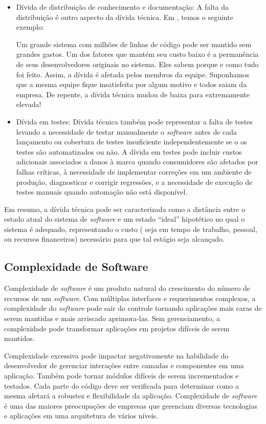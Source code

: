 \begin{itemize}
	\item Dívida de distribuição de conhecimento e documentação: A falta da distribuição é outro aspecto da dívida técnica. Em \cite{slinker2008}, temos o seguinte exemplo:
	\begin{quoteAbnt}
		Um grande sistema com milhões de linhas de código pode ser mantido sem grandes gastos. Um dos fatores que mantém seu custo baixo é a permanência de seus desenvolvedores originais no sistema. Eles sabem porque e como tudo foi feito. Assim, a dívida é afetada pelos membros da equipe. Suponhamos que a mesma equipe fique insatisfeita por algum motivo e todos saiam da empresa. De repente, a dívida técnica mudou de baixa para extremamente elevada!
	\end{quoteAbnt}
	\item Dívida em testes:	Dívida técnica também pode representar a falta de testes levando a necessidade de testar manualmente o \textit{software} antes de cada lançamento ou cobertura de testes insuficiente independentemente se o os testes são automatizados ou não. A dívida em testes  pode incluir custos adicionais associados a danos à marca quando consumidores são afetados por falhas críticas, à necessidade de implementar correções em um ambiente de produção, diagnosticar e corrigir regressões, e a necessidade de execução de testes manuais quando automação não está disponível.
\end{itemize}

Em resumo, a dívida técnica pode ser caracterizada como a distância entre o estado atual do sistema de \textit{software} e um estado ``ideal'' hipotético no qual o sistema é adequado\cite{brown2010managing}, representando o custo ( seja em tempo de trabalho, pessoal, ou recursos financeiros) necessário para que tal estágio seja alcançado.
\subsection{Complexidade de Software}
Complexidade de \textit{software} é um produto natural do crescimento do número de recursos de um \textit{software}. Com múltiplas interfaces e requerimentos complexos, a complexidade do \textit{software} pode sair do controle tornando aplicações mais caras de serem mantidas e mais arriscado aprimora-las. Sem gerenciamento, a complexidade pode transformar aplicações em projetos difíceis de serem mantidos.

Complexidade excessiva pode impactar negativamente na habilidade do desenvolvedor de gerenciar interações entre camadas e componentes em uma aplicação. Também pode tornar módulos difíceis de serem incrementados e testados. Cada parte do código deve ser verificada para determinar como a mesma afetará a robustez e flexibilidade da aplicação. Complexidade de \textit{software} é uma das maiores preocupações de empresas que gerenciam diversas tecnologias e aplicações em uma arquitetura de vários níveis.

